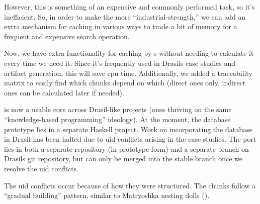 
However, this is something of an expensive and commonly performed task, so it's
inefficient. So, in order to make the \ChunkDB{} more ``industrial-strength,''
we can add an extra mechanism for caching in various ways to trade a bit of
memory for a frequent and expensive search operation.


Now, we have extra functionality for caching by \TypeRep{}s without needing to
calculate it every time we need it. Since it's frequently used in Drasils case
studies and artifact generation, this will save \acs{cpu} time. Additionally, we
added a traceability matrix to easily find which chunks depend on which (direct
ones only, indirect ones can be calculated later if needed).

\ChunkDB{} is now a usable core across Drasil-like projects (ones thriving on
the same ``knowledge-based programming'' ideology). At the moment, the database
prototype lies in a separate Haskell project. Work on incorporating the database
in Drasil has been halted due to \acs{uid} conflicts arising in the case
studies. The port lies in both a separate repository (in prototype form) and a
separate branch on Drasils git repository, but can only be merged into the
stable branch once we resolve the \acs{uid} conflicts.


\matryoshkaDollsImg{}

The \acs{uid} conflicts occur because of how they were structured. The chunks
follow a ``gradual building'' pattern, similar to Matryoshka nesting
dolls ().




